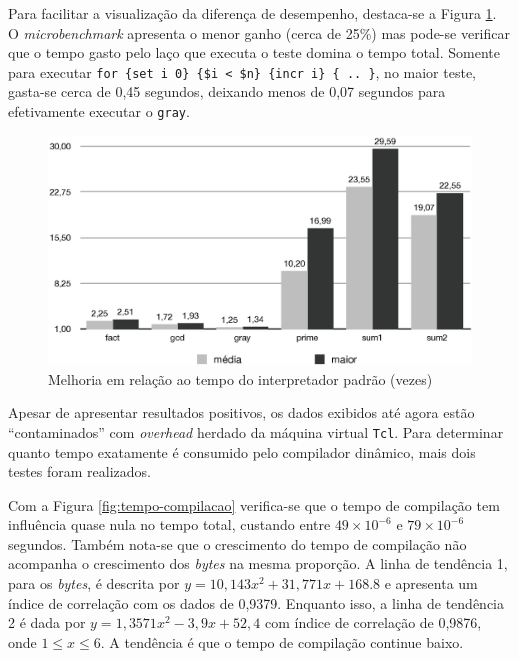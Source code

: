 Para facilitar a visualização da diferença de desempenho,
destaca-se a Figura \ref{fig:media-tempo}. O \textit{microbenchmark}
apresenta o menor ganho (cerca de 25\%) mas pode-se verificar que o
tempo gasto pelo laço que
executa o teste domina o tempo total. Somente para executar
\verb!for {set i 0} {$i < $n} {incr i} { .. }!, no maior
teste, gasta-se cerca
de 0,45 segundos, deixando menos de 0,07 segundos para efetivamente
executar o \verb!gray!.

\begin{figure}[ht]
  \centering
  \includegraphics[scale=0.70]{figs/melhoria}
  \caption{Melhoria em relação ao tempo do interpretador padrão (vezes) \label{fig:media-tempo}}
\end{figure}

Apesar de apresentar resultados positivos, os dados exibidos até
agora estão ``contaminados'' com \textit{overhead} herdado da
máquina virtual \texttt{Tcl}. Para determinar quanto tempo exatamente
é consumido pelo compilador dinâmico, mais dois testes foram
realizados.

Com a Figura \ref{fig:tempo-compilacao} verifica-se que o tempo de
compilação tem influência quase nula no tempo total, custando entre
$49 \times 10^{-6}$ e $79 \times 10^{-6}$ segundos. Também nota-se que
o crescimento do tempo de compilação não acompanha o crescimento dos
\textit{bytes} na mesma proporção.
A linha de tendência 1, para os \textit{bytes}, é
descrita por $y = 10,143x^2 + 31,771x + 168.8$ e apresenta um índice
de correlação com os dados de 0,9379. Enquanto isso, a linha de
tendência 2 é dada por $y = 1,3571x^2 - 3,9x + 52,4$ com índice de
correlação de 0,9876, onde $1 \le x \le 6$. A tendência é que o tempo
de compilação continue baixo.

